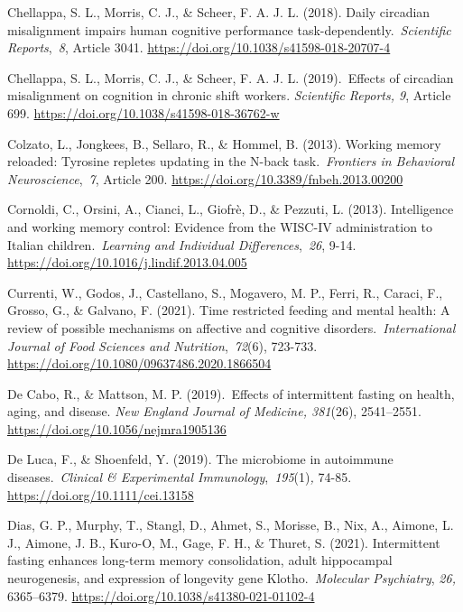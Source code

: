 \documentclass[authordate, empirical,issue]{jote-new-article}
\begin{document}
Chellappa, S. L., Morris, C. J., \& Scheer, F. A. J. L. (2018). Daily circadian misalignment impairs human cognitive performance task-dependently. \emph{Scientific Reports}, \emph{8}, Article 3041. \url{https://doi.org/10.1038/s41598-018-20707-4}



Chellappa, S. L., Morris, C. J., \& Scheer, F. A. J. L. (2019). Effects of circadian misalignment on cognition in chronic shift workers.\emph{ Scientific Reports, 9}, Article 699. \url{https://doi.org/10.1038/s41598-018-36762-w}



Colzato, L., Jongkees, B., Sellaro, R., \& Hommel, B. (2013). Working memory reloaded: Tyrosine repletes updating in the N-back task. \emph{Frontiers in Behavioral Neuroscience}, \emph{7}, Article 200. \url{https://doi.org/10.3389/fnbeh.2013.00200}



Cornoldi, C., Orsini, A., Cianci, L., Giofrè, D., \& Pezzuti, L. (2013). Intelligence and working memory control: Evidence from the WISC-IV administration to Italian children. \emph{Learning and Individual Differences}, \emph{26}, 9-14. \url{https://doi.org/10.1016/j.lindif.2013.04.005}



Currenti, W., Godos, J., Castellano, S., Mogavero, M. P., Ferri, R., Caraci, F., Grosso, G., \& Galvano, F. (2021). Time restricted feeding and mental health: A review of possible mechanisms on affective and cognitive disorders. \emph{International Journal of Food Sciences and Nutrition}, \emph{72}(6), 723-733. \url{https://doi.org/10.1080/09637486.2020.1866504}



De Cabo, R., \& Mattson, M. P. (2019). Effects of intermittent fasting on health, aging, and disease.\emph{ New England Journal of Medicine, 381}(26), 2541--2551. \url{https://doi.org/10.1056/nejmra1905136}



De Luca, F., \& Shoenfeld, Y. (2019). The microbiome in autoimmune diseases. \emph{Clinical \& Experimental Immunology}, \emph{195}(1)\emph{,} 74-85. \url{https://doi.org/10.1111/cei.13158}



Dias, G. P., Murphy, T., Stangl, D., Ahmet, S., Morisse, B., Nix, A., Aimone, L. J., Aimone, J. B., Kuro-O, M., Gage, F. H., \& Thuret, S. (2021). Intermittent fasting enhances long-term memory consolidation, adult hippocampal neurogenesis, and expression of longevity gene Klotho. \emph{Molecular Psychiatry}, \emph{26,} 6365--6379. \url{https://doi.org/10.1038/s41380-021-01102-4}
\end{document}
